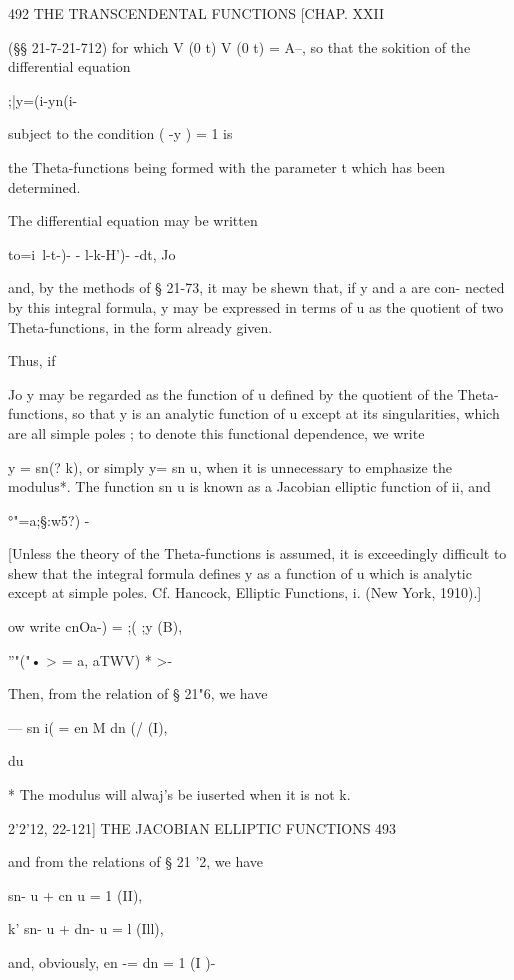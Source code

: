 492 THE TRANSCENDENTAL FUNCTIONS [CHAP. XXII

(§§ 21-7-21-712) for which V (0 t) V (0 t) = A--, so that the sokition
of the differential equation

;|y=(i-yn(i-%

subject to the condition ( -y ) = 1 is

the Theta-functions being formed with the parameter t which has been
determined.

The differential equation may be written

to=i\ l-t-)- - l-k-H')- -dt, Jo

and, by the methods of § 21-73, it may be shewn that, if y and a are
con- nected by this integral formula, y may be expressed in terms of u
as the quotient of two Theta-functions, in the form already given.

Thus, if

Jo y may be regarded as the function of u defined by the quotient of
the Theta- functions, so that y is an analytic function of u except at
its singularities, which are all simple poles ; to denote this
functional dependence, we write

y = sn(? k), or simply y= sn u, when it is unnecessary to emphasize
the modulus*. The function sn u is known as a Jacobian elliptic
function of ii, and

 °"=a;§:w5?) -

[Unless the theory of the Theta-functions is assumed, it is
exceedingly difficult to shew that the integral formula defines y as a
function of u which is analytic except at simple poles. Cf. Hancock,
Elliptic Functions, i. (New York, 1910).]

 ow write cnOa-) = ;( ;y (B),



''"("• > = a, aTWV) * >-

Then, from the relation of § 21"6, we have

 — sn i( = en M dn (/ (I),

du

* The modulus will alwaj's be iuserted when it is not k.



2'2'12, 22-121] THE JACOBIAN ELLIPTIC FUNCTIONS 493

and from the relations of § 21 '2, we have

sn- u + cn u = 1 (II),

k' sn- u + dn- u = l (Ill),

and, obviously, en -= dn = 1 (I )-

